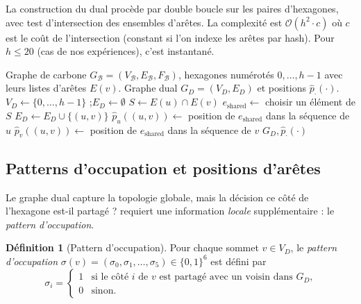\documentclass[12pt,a4paper]{article}
\theoremstyle{definition}
\newtheorem{definition}{D\'efinition}[section]
\theoremstyle{remark}
\newcommand{\B}{\mathcal{B}}
\newcommand{\GD}{G_{\!D}}
\newcommand{\GB}{G_{\!\B}}
\newcommand{\VD}{V_{\!D}}
\newcommand{\ED}{E_{\!D}}
\newcommand{\posIn}[2]{\hat{p}_{#1}(#2)}
\newcommand{\bigO}{\mathcal{O}}
\begin{document}
La construction du dual proc\`ede par double boucle sur les paires
d'hexagones, avec test d'intersection des ensembles d'ar\^etes. La
complexit\'e est $\bigO(h^2 \cdot c)$ o\`u $c$ est le co\^ut de
l'intersection (constant si l'on indexe les ar\^etes par hash).
Pour $h \leq 20$ (cas de nos exp\'eriences), c'est instantan\'e.

\begin{algorithm}[!ht]
\caption{Construction du graphe dual $\GD$ depuis $\GB$.}
\label{alg:dual}
\begin{algorithmic}[1]
\Require Graphe de carbone $\GB = (V_\B, E_\B, F_\B)$, hexagones num\'erot\'es
$0, \ldots, h-1$ avec leurs listes d'ar\^etes $E(v)$.
\Ensure Graphe dual $\GD = (\VD, \ED)$ et positions $\posIn{\cdot}{\cdot}$.
\State $\VD \gets \{0, \ldots, h-1\}$ ;\quad $\ED \gets \emptyset$
    \State $S \gets E(u) \cap E(v)$ 
      \State $e_\text{shared} \gets$ choisir un \'el\'ement de $S$
      \State $\ED \gets \ED \cup \{(u, v)\}$
      \State $\posIn{u}{(u,v)} \gets$ position de $e_\text{shared}$ dans la s\'equence de $u$
      \State $\posIn{v}{(u,v)} \gets$ position de $e_\text{shared}$ dans la s\'equence de $v$
    \EndIf
  \EndFor
\EndFor
\State \Return $\GD, \posIn{\cdot}{\cdot}$
\end{algorithmic}
\end{algorithm}

\subsection{Patterns d'occupation et positions d'ar\^etes}
\label{sec:patterns}

Le graphe dual capture la topologie globale, mais la d\'ecision \og ce
c\^ot\'e de l'hexagone est-il partag\'e ? \fg{} requiert une information
\emph{locale} suppl\'ementaire : le \emph{pattern d'occupation}.

\begin{definition}[Pattern d'occupation]
\label{def:pattern}
Pour chaque sommet $v \in \VD$, le \emph{pattern d'occupation}
$\sigma(v) = (\sigma_0, \sigma_1, \ldots, \sigma_5) \in \{0, 1\}^6$
est d\'efini par
\[
  \sigma_i = \begin{cases}
    1 & \text{si le c\^ot\'e $i$ de $v$ est partag\'e avec un voisin dans $\GD$,}\\
    0 & \text{sinon.}
  \end{cases}
\]
\end{definition}
\end{document}
